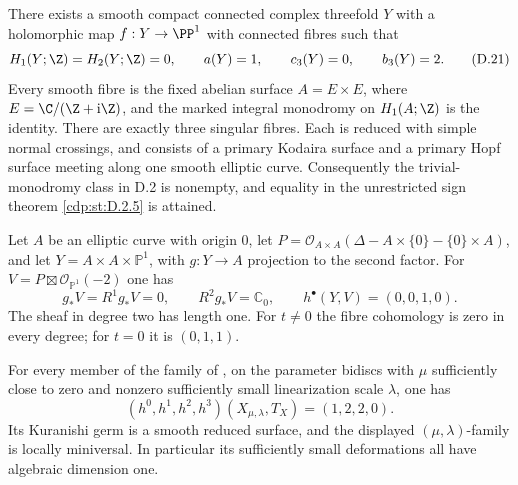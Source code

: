 \begin{proposition}\label{cdp:st:D.2.7}


There exists a smooth compact connected complex threefold $Y$
with a holomorphic map $f:Y\to\PP^1$ with connected fibres such
that
\[
 H_1(Y;\Z)=H_2(Y;\Z)=0,\qquad
 a(Y)=1,\qquad c_3(Y)=0,\qquad b_3(Y)=2.
\tag{D.21}\label{cdp:eq:D.21}
\]
Every smooth fibre is the fixed abelian surface
$A=E\times E$, where $E=\C/(\Z+\mathrm i\Z)$, and the marked
integral monodromy on $H_1(A;\Z)$ is the identity. There are
exactly three singular fibres. Each is reduced with simple
normal crossings, and consists of a primary Kodaira surface
and a primary Hopf surface meeting along one smooth elliptic
curve. Consequently the trivial-monodromy class in D.2 is
nonempty, and equality in the unrestricted sign theorem
\ref{cdp:st:D.2.5} is attained.
\end{proposition}

\begin{proposition}\label{cdp:st:E12}

Let $A$ be an elliptic curve with origin $0$, let
$P=\mathcal O_{A\times A}(\Delta-A\times\{0\}-\{0\}\times A)$,
and let $Y=A\times A\times\mathbb P^1$, with $g:Y\to A$
projection to the second factor. For
$V=P\boxtimes\mathcal O_{\mathbb P^1}(-2)$ one has
\[
 g_*V=R^1g_*V=0,\qquad R^2g_*V=\mathbb C_0,
 \qquad h^\bullet(Y,V)=(0,0,1,0).
\]
The sheaf in degree two has length one. For $t\ne0$ the fibre
cohomology is zero in every degree; for $t=0$ it is $(0,1,1)$.
\end{proposition}

\begin{proposition}\label{cdp:st:E13}

For every member of the family of
\cite[Proposition labelled \texttt{family}]{Viaclovsky2026Two}, on the parameter
bidiscs with $\mu$ sufficiently close to zero and nonzero sufficiently
small linearization scale $\lambda$, one has
\[
 (h^0,h^1,h^2,h^3)(X_{\mu,\lambda},T_X)=(1,2,2,0).
\]
Its Kuranishi germ is a smooth reduced surface, and the displayed
$(\mu,\lambda)$-family is locally miniversal. In particular its
sufficiently small deformations all have algebraic dimension one.
\end{proposition}

